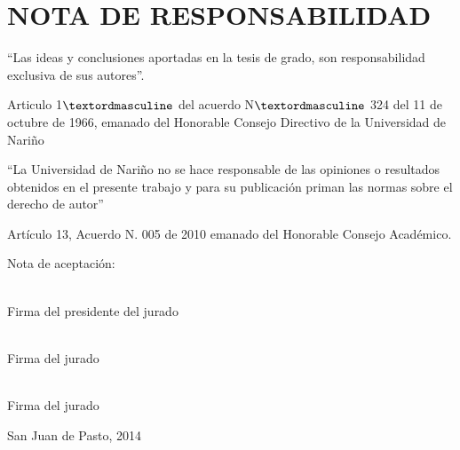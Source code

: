 \chapter*{NOTA DE RESPONSABILIDAD}

``Las ideas y conclusiones aportadas en la tesis de grado, son 
responsabilidad exclusiva de sus autores''.

Articulo 1$\textordmasculine$ del acuerdo N$\textordmasculine$ 324 del 11 de octubre de 1966, 
emanado del 
Honorable Consejo Directivo de la Universidad de Nariño

``La Universidad de Nariño no se hace responsable de las opiniones o resultados obtenidos 
en el presente trabajo y para su publicación priman las normas sobre el derecho de autor''

Artículo 13, Acuerdo N. 005 de 2010 emanado del Honorable Consejo Académico.

\newpage
\vspace*{1 mm}
\begin{flushright}
Nota de aceptación:\linebreak \linebreak \linebreak 

\underline{\hspace{8cm}}\linebreak \linebreak
\underline{\hspace{8cm}}\linebreak \linebreak
\underline{\hspace{8cm}}\linebreak \linebreak
\underline{\hspace{8cm}}

\vspace{1cm}
\underline{\hspace{8cm}}\\
Firma del presidente del jurado \linebreak \linebreak \linebreak \linebreak \linebreak 

\underline{\hspace{8cm}}\\
Firma del jurado \linebreak \linebreak 

\vspace{1cm}
\underline{\hspace{8cm}}\\
Firma del jurado

\end{flushright}


\vspace{1cm}
San Juan de Pasto, 2014 

